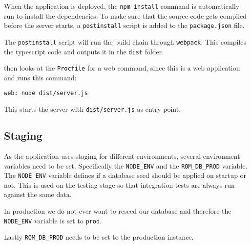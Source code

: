 When the application is deployed, the \verb+npm install+ command is automatically run to install the dependencies. 
To make sure that the source code gets compiled before the server starts, a \verb+postinstall+ script is added to the \verb+package.json+ file.

The \verb+postinstall+ script will run the build chain through \verb+webpack+. 
This compiles the \gls{typescript} code and outputs it in the \verb+dist+ folder.

 then looks at the \verb+Procfile+ for a web command, since this is a web application and runs this command:

\verb+web: node dist/server.js+

This starts the  server with \verb+dist/server.js+ as entry point.

\subsection{Staging}
\label{sec:staging}
As the application uses staging for different environments, several environment variables need to be set.
Specifically the \verb+NODE_ENV+ and the \verb+ROM_DB_PROD+ variable. 
The \verb+NODE_ENV+ variable defines if a database seed should be applied on startup or not. 
This is used on the testing stage so that integration tests are always run against the same data.

In production we do not ever want to reseed our database and therefore the \verb+NODE_ENV+ variable is set to \verb+prod+.

Lastly \verb+ROM_DB_PROD+ needs to be set to the production  instance.

